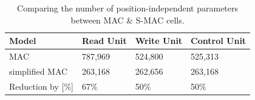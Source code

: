 \documentclass[final,paperwidth=36in,paperheight=48in,portrait,fontscale=0.36]{baposter}
\begin{document}
\begin{poster}
{\begin{table}[H]
	\centering
	\caption{Comparing the number of position-independent parameters between MAC \& S-MAC cells.}
	\begin{tabular}{llll}
		\toprule
		Model        & Read Unit               & Write Unit &  Control Unit         \\
		\midrule
		MAC   &  787,969 &  524,800        &    525,313    \\
		simplified MAC & 263,168  & 262,656       &    263,168 \\
		\midrule
		Reduction by [\%]  & 67\%  &   50\%       &      50\%  \\
		\bottomrule
	\end{tabular}
	\label{tab:mac_cell_parameters}
\end{table}

}






\end{poster}
\end{document}

